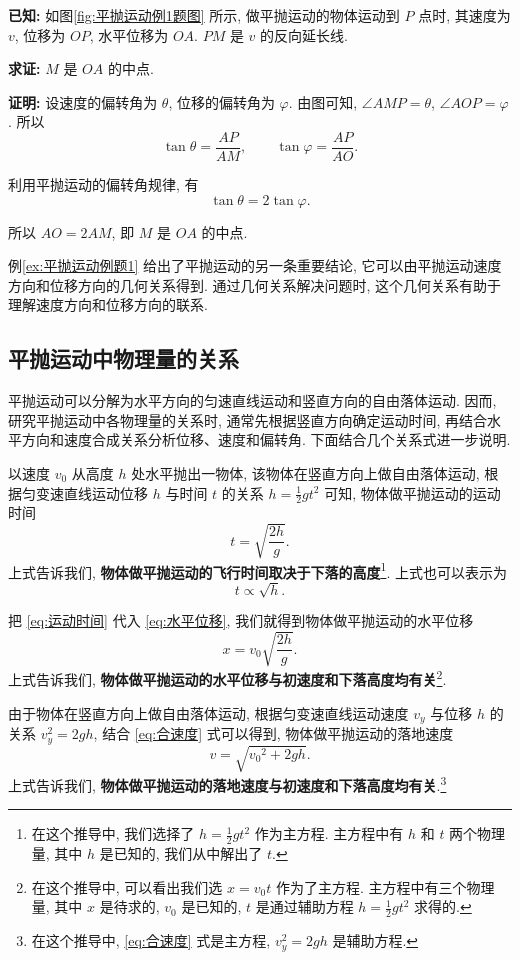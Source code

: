 \documentclass[UTF8,openany,fontset=fandol]{ctexbook}
\theoremstyle{chinesetextbook}
\newenvironment{cnproof}{\par\indent\textbf{证明:} \ignorespaces}{\par}
\begin{document}
\par\indent\textbf{已知:} 如图\ref{fig:平抛运动例1题图} 所示, 做平抛运动的物体运动到 $P$ 点时, 其速度为 $v$, 位移为 $OP$, 水平位移为 $OA$. $PM$ 是 $v$ 的反向延长线.

\par\indent\textbf{求证:} $M$ 是 $OA$ 的中点.

\begin{cnproof}
设速度的偏转角为 $\theta$, 位移的偏转角为 $\varphi$. 由图可知, $\angle AMP=\theta$, $\angle AOP=\varphi$. 所以
\[
\tan\theta=\frac{AP}{AM},\qquad\tan\varphi=\frac{AP}{AO}.
\]

利用平抛运动的偏转角规律, 有
\[
\tan\theta=2\tan\varphi.
\]

所以 $AO=2AM$, 即 $M$ 是 $OA$ 的中点.
\end{cnproof}
例\ref{ex:平抛运动例题1} 给出了平抛运动的另一条重要结论, 它可以由平抛运动速度方向和位移方向的几何关系得到. 通过几何关系解决问题时, 这个几何关系有助于理解速度方向和位移方向的联系.
\subsection{平抛运动中物理量的关系}
平抛运动可以分解为水平方向的匀速直线运动和竖直方向的自由落体运动. 因而, 研究平抛运动中各物理量的关系时, 通常先根据竖直方向确定运动时间, 再结合水平方向和速度合成关系分析位移、速度和偏转角. 下面结合几个关系式进一步说明.

以速度 $v_0$ 从高度 $h$ 处水平抛出一物体, 该物体在竖直方向上做自由落体运动, 根据匀变速直线运动位移 $h$ 与时间 $t$ 的关系 $\displaystyle h=\frac{1}{2}gt^2$ 可知, 物体做平抛运动的运动时间
\begin{equation}\label{eq:运动时间}
t=\sqrt{\frac{2h}{g}}.
\end{equation}
上式告诉我们, \textbf{物体做平抛运动的飞行时间取决于下落的高度}\footnote{在这个推导中, 我们选择了 $\displaystyle h=\frac{1}{2}gt^2$ 作为主方程. 主方程中有 $h$ 和 $t$ 两个物理量, 其中 $h$ 是已知的, 我们从中解出了 $t$.}. 上式也可以表示为
\[
t\propto\sqrt{h}.
\]

把 \eqref{eq:运动时间} 代入 \eqref{eq:水平位移}, 我们就得到物体做平抛运动的水平位移
\[
x=v_0\sqrt{\frac{2h}{g}}.
\]
上式告诉我们, \textbf{物体做平抛运动的水平位移与初速度和下落高度均有关}\footnote{在这个推导中, 可以看出我们选 $x=v_0t$ 作为了主方程. 主方程中有三个物理量, 其中 $x$ 是待求的, $v_0$ 是已知的, $t$ 是通过辅助方程 $\displaystyle h=\frac{1}{2}gt^2$ 求得的.}.

由于物体在竖直方向上做自由落体运动, 根据匀变速直线运动速度 $v_y$ 与位移 $h$ 的关系 $v_y^2=2gh$, 结合 \eqref{eq:合速度} 式可以得到, 物体做平抛运动的落地速度
\[
v=\sqrt{{v_0}^2+2gh}.
\]
上式告诉我们, \textbf{物体做平抛运动的落地速度与初速度和下落高度均有关}.\footnote{在这个推导中, \eqref{eq:合速度} 式是主方程, $v_y^2=2gh$ 是辅助方程.}
\end{document}
